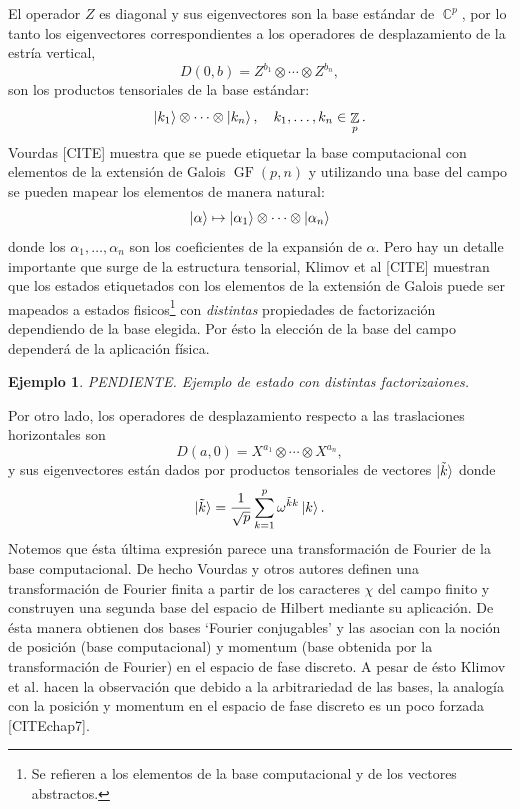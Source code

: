 \documentclass[a4paper]{report}
\DeclareMathOperator{\C}{\mathbb{C}}
\DeclareMathOperator{\Z}{\mathbb{Z}}
\DeclareMathOperator{\GF}{GF}
\newtheorem{example}{Ejemplo}
\begin{document}
  El operador $Z$ es diagonal y sus eigenvectores son la
  base estándar de $\C^{p}$, por lo tanto los eigenvectores
  correspondientes a los operadores de desplazamiento de la
  estría vertical, 
  \[
    D(0,b) = Z^{b_1} \otimes \cdots \otimes Z^{b_n},
  \] 
  son los productos tensoriales de la base estándar:
  \[
    \ket{k_1} \otimes \cdots \otimes \ket{k_n},
    \quad k_1,\ldots,k_n \in \Z_p.
  \] 
  Vourdas [CITE] muestra que se puede etiquetar la base
  computacional con elementos de la extensión de Galois
  $\GF(p,n)$ y utilizando una base del campo se pueden
  mapear los elementos de manera natural:
  \[
    \ket \alpha
    \mapsto \ket{\alpha_1} \otimes \cdots \otimes
    \ket{\alpha_n}
  \] 
  donde los $\alpha_1,\ldots,\alpha_n$ son los coeficientes
  de la expansión de $\alpha$. Pero hay un detalle
  importante que surge de la estructura tensorial, Klimov et
  al [CITE] muestran que los estados etiquetados con los
  elementos de la extensión de Galois puede ser mapeados a
  estados fisicos\footnote{Se refieren a los elementos de la
  base computacional y de los vectores abstractos.} con
  \textit{distintas} propiedades de factorización
  dependiendo de la base elegida. Por ésto la elección de la
  base del campo dependerá de la aplicación física.
  \begin{example}
    PENDIENTE. Ejemplo de estado con distintas factorizaiones.
  \end{example}
  Por otro lado, los operadores de desplazamiento respecto a
  las traslaciones horizontales son
  \[
    D(a,0) = X^{a_1} \otimes \cdots \otimes X^{a_n},
  \] 
  y sus eigenvectores están dados por productos tensoriales
  de vectores $\ket{\tilde k}$ donde
  \[
    \ket{\tilde k}
    = \frac{1}{\sqrt{p}} \sum_{k=1}^{p}
    \omega^{\tilde k k} \ket k.
  \] 
  Notemos que ésta última expresión parece una
  transformación de Fourier de la base computacional. De
  hecho Vourdas y otros autores definen una transformación
  de Fourier finita a partir de los caracteres $\chi$ del
  campo finito y construyen una segunda base del espacio de
  Hilbert mediante su aplicación. De ésta manera obtienen
  dos bases `Fourier conjugables' y las asocian con la
  noción de posición (base computacional) y momentum (base
  obtenida por la transformación de Fourier) en el espacio
  de fase discreto. A pesar de ésto Klimov et al. hacen la
  observación que debido a la arbitrariedad de las bases, la
  analogía con la posición y momentum en el espacio de fase
  discreto es un poco forzada [CITEchap7].
\end{document}
